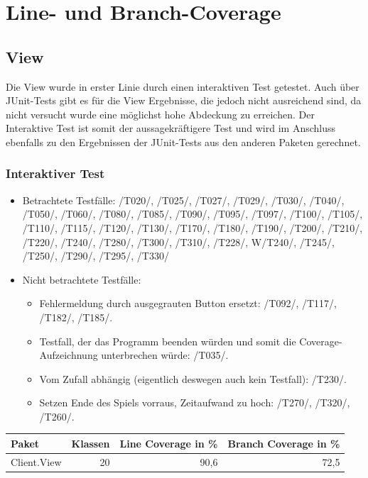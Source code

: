 \documentclass[a4paper]{article}
\begin{document}
\section{Line- und Branch-Coverage}
	\subsection{View}
	Die View wurde in erster Linie durch einen interaktiven Test getestet. Auch über JUnit-Tests gibt es für die View Ergebnisse, die jedoch nicht ausreichend sind, da nicht versucht wurde eine möglichst hohe Abdeckung zu erreichen.
Der Interaktive Test ist somit der aussagekräftigere Test und wird im Anschluss ebenfalls zu den Ergebnissen der JUnit-Tests aus den anderen Paketen gerechnet.
	\subsubsection{Interaktiver Test}
	\begin{itemize}
	\item Betrachtete Testfälle:
	/T020/, /T025/, /T027/, /T029/, /T030/, /T040/, /T050/, /T060/, /T080/, /T085/, /T090/, /T095/, /T097/, /T100/, /T105/, 		/T110/, /T115/, /T120/, /T130/, /T170/, /T180/, /T190/, /T200/, /T210/, /T220/, /T240/, /T280/, /T300/, /T310/, /T228/, 		W/T240/, /T245/,  /T250/, /T290/, /T295/, /T330/  \\
	\item Nicht betrachtete Testfälle: \\
	\begin{itemize}
	\item Fehlermeldung durch ausgegrauten Button ersetzt: /T092/, /T117/, /T182/, /T185/. \\
	\item Testfall, der das Programm beenden würden und somit die Coverage-Aufzeichnung unterbrechen würde: /T035/. \\
	\item Vom Zufall abhängig (eigentlich deswegen auch kein Testfall): /T230/. \\
	\item Setzen Ende des Spiels vorraus, Zeitaufwand zu hoch: /T270/, /T320/, /T260/. \\
	\end{itemize}
	\end{itemize}
	
	
\noindent
\begin{tabular}{|l|r|r|r|}
\hline
Paket & Klassen & Line Coverage in \% & Branch Coverage in \% \\ \hline \hline
Client.View & \multicolumn{1}{r|}{20} & \multicolumn{1}{r|}{90,6} & \multicolumn{1}{r|}{72,5} \\ \hline
\end{tabular}
\end{document}
